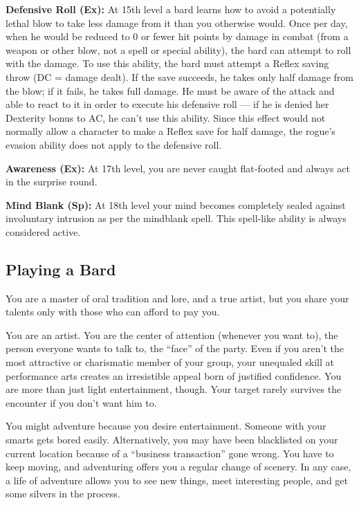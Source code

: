 \documentclass[10pt,a4paper,twocolumn]{d20}
\begin{document}
{\textbf{Defensive Roll (Ex):} At 15th level a bard learns how to avoid a potentially lethal blow to take less damage from it than you otherwise would. Once per day, when he would be reduced to 0 or fewer hit points by damage in combat (from a weapon or other blow, not a spell or special ability), the bard can attempt to roll with the damage. To use this ability, the bard must attempt a Reflex saving throw (DC = damage dealt). If the save succeeds, he takes only half damage from the blow; if it fails, he takes full damage. He must be aware of the attack and able to react to it in order to execute his defensive roll — if he is denied her Dexterity bonus to AC, he can’t use this ability. Since this effect would not normally allow a character to make a Reflex save for half damage, the rogue’s evasion ability does not apply to the defensive roll.

\textbf{Awareness (Ex):} At 17th level, you are never caught flat‐footed and always act in the surprise round.

\textbf{Mind Blank (Sp):} At 18th level your mind becomes completely sealed against involuntary intrusion as per the mindblank spell. This spell‐like ability is always considered active.

\subsection{Playing a Bard}

You are a master of oral tradition and lore, and a true artist, but you share your talents only with those who can afford to pay you.

You are an artist. You are the center of attention (whenever you want to), the person everyone wants to talk to, the “face” of the party. Even if you aren’t the most attractive or charismatic member of your group, your unequaled skill at performance arts creates an irresistible appeal born of justified confidence. You are more than just light entertainment, though. Your target rarely survives the encounter if you don’t want him to.

You might adventure because you desire entertainment. Someone with your smarts gets bored easily. Alternatively, you may have been blacklisted on your current location because of a “business transaction” gone wrong. You have to keep moving, and adventuring offers you a regular change of scenery. In any case, a life of adventure allows you to see new things, meet interesting people, and get some silvers in the process.

}
\end{document}

